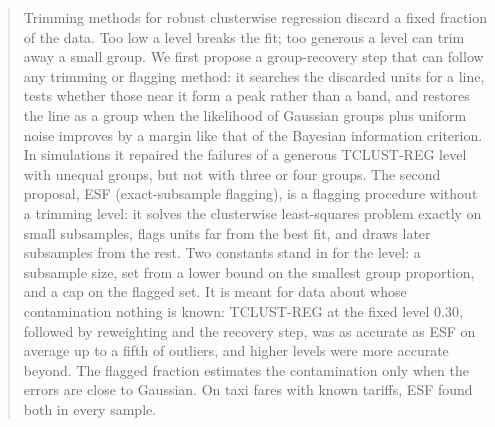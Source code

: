 \begin{abstract}
Trimming methods for robust clusterwise regression discard a fixed fraction of the data. Too low
a level breaks the fit; too generous a level can trim away a small group. We first propose
a group-recovery step that can follow any trimming or flagging method: it searches the discarded
units for a line, tests whether those near it form a peak rather than a band, and restores the
line as a group when the likelihood of Gaussian groups plus uniform noise improves by a margin
like that of the Bayesian information criterion. In simulations it repaired the failures of a
generous TCLUST-REG level with unequal groups, but not with three or four groups. The second
proposal, ESF (exact-subsample flagging), is a flagging procedure without a trimming level: it solves the clusterwise least-squares
problem exactly on small subsamples, flags units far from the best fit, and draws later
subsamples from the rest. Two constants stand in for the level: a subsample size, set from a
lower bound on the smallest group proportion, and a cap on the flagged set. It is meant for
data about whose contamination nothing is known: TCLUST-REG at the fixed level 0.30, followed by
reweighting and the recovery step, was as accurate as ESF on average up to a fifth of outliers, and
higher levels were more accurate beyond. The
flagged fraction estimates the contamination only when the errors are close to Gaussian. On taxi
fares with known tariffs, ESF found both in every sample.
\end{abstract}
